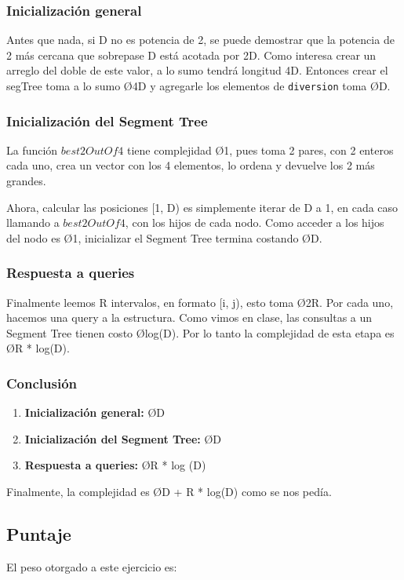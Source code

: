 \subsubsection{Inicialización general}
Antes que nada, si D no es potencia de 2, se puede demostrar que la potencia de 2 m\'as cercana que sobrepase D est\'a acotada por 2D. Como interesa crear un arreglo del doble de este valor, a lo sumo tendr\'a longitud 4D. Entonces crear el segTree toma a lo sumo \O{4D} y agregarle los elementos de \texttt{diversion} toma \O{D}.

\subsubsection{Inicialización del Segment Tree}
La funci\'on $best2OutOf4$ tiene complejidad \O{1}, pues toma 2 pares, con 2 enteros cada uno, crea un vector con los 4 elementos, lo ordena y devuelve los 2 m\'as grandes.

Ahora, calcular las posiciones [1, D) es simplemente iterar de D a 1, en cada caso llamando a $best2OutOf4$, con los hijos de cada nodo. Como acceder a los hijos del nodo es \O{1}, inicializar el Segment Tree termina costando \O{D}.

\subsubsection{Respuesta a queries}
Finalmente leemos R intervalos, en formato [i, j), esto toma \O{2R}. Por cada uno, hacemos una query a la estructura. Como vimos en clase, las consultas a un Segment Tree tienen costo \O{log(D)}. Por lo tanto la complejidad de esta etapa es \O{R * log(D)}.

\subsubsection{Conclusión}
\begin{enumerate}
\item \textbf{Inicialización general:} \O{D}
\item \textbf{Inicialización del Segment Tree:} \O{D}
\item \textbf{Respuesta a queries:} \O{R * log (D)}
\end{enumerate}

Finalmente, la complejidad es \O{D + R * log(D)} como se nos ped\'ia.

\subsection{Puntaje}
El peso otorgado a este ejercicio es:
